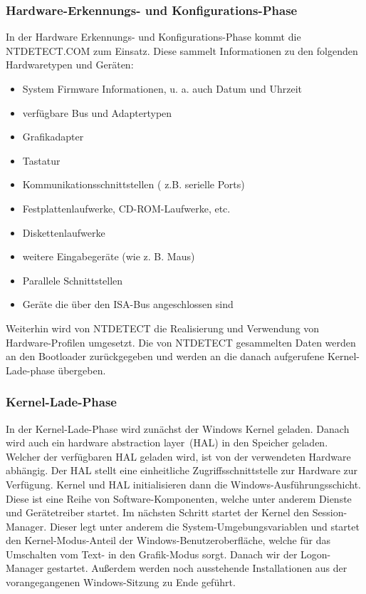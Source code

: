 \subsubsection{Hardware-Erkennungs- und Konfigurations-Phase}
In der Hardware Erkennungs- und Konfigurations-Phase kommt die NTDETECT.COM zum Einsatz. Diese sammelt Informationen zu den folgenden Hardwaretypen und Geräten:
\begin{itemize}
	\item System Firmware Informationen, u. a. auch Datum und Uhrzeit
	\item verfügbare Bus und Adaptertypen
	\item Grafikadapter
	\item Tastatur
	\item Kommunikationsschnittstellen ( z.B. serielle Ports)
	\item Festplattenlaufwerke, CD-ROM-Laufwerke, etc.
	\item Diskettenlaufwerke
	\item weitere Eingabegeräte (wie z. B. Maus)
	\item Parallele Schnittstellen
	\item Geräte die über den ISA-Bus angeschlossen sind
\end{itemize}
Weiterhin  wird von NTDETECT die Realisierung und Verwendung von Hardware-Profilen umgesetzt. Die von NTDETECT gesammelten Daten werden an den Bootloader zurückgegeben und werden an die danach aufgerufene Kernel-Lade-phase übergeben.

\subsubsection{Kernel-Lade-Phase}
In der Kernel-Lade-Phase wird zunächst der Windows Kernel geladen. Danach wird auch ein \ql hardware abstraction layer\@r\ (HAL) in den Speicher geladen. Welcher der verfügbaren HAL geladen wird, ist von der verwendeten Hardware abhängig. Der HAL stellt eine einheitliche Zugriffsschnittstelle zur Hardware zur Verfügung.  Kernel und HAL initialisieren dann die Windows-Ausführungsschicht. Diese ist eine Reihe von Software-Komponenten, welche unter anderem Dienste und Gerätetreiber startet. Im nächsten Schritt startet der Kernel den Session-Manager. Dieser legt unter anderem die System-Umgebungsvariablen und startet den Kernel-Modus-Anteil der Windows-Benutzeroberfläche, welche für das Umschalten vom Text- in den Grafik-Modus sorgt. Danach wir der Logon-Manager gestartet. Außerdem werden noch ausstehende Installationen aus der vorangegangenen Windows-Sitzung zu Ende geführt.

